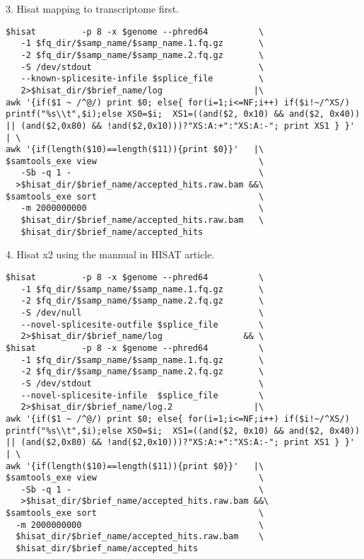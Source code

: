 \begin{frame}[c,fragile]
	\begin{block}{ 3. Hisat mapping to transcriptome first. }
		\begin{lstlisting}[basicstyle=\tiny]
$hisat         -p 8 -x $genome --phred64          \
   -1 $fq_dir/$samp_name/$samp_name.1.fq.gz       \
   -2 $fq_dir/$samp_name/$samp_name.2.fq.gz       \
   -S /dev/stdout                                 \
   --known-splicesite-infile $splice_file         \
   2>$hisat_dir/$brief_name/log                  |\
awk '{if($1 ~ /^@/) print $0; else{ for(i=1;i<=NF;i++) if($i!~/^XS/) printf("%s\\t",$i);else XS0=$i;  XS1=((and($2, 0x10) && and($2, 0x40)) || (and($2,0x80) && !and($2,0x10)))?"XS:A:+":"XS:A:-"; print XS1 } }' | \
awk '{if(length($10)==length($11)){print $0}}'   |\
$samtools_exe view                                \
   -Sb -q 1 -                                     \
  >$hisat_dir/$brief_name/accepted_hits.raw.bam &&\
$samtools_exe sort                                \
   -m 2000000000                                  \
   $hisat_dir/$brief_name/accepted_hits.raw.bam   \
   $hisat_dir/$brief_name/accepted_hits		
		\end{lstlisting}
	\end{block}
\end{frame}

\begin{frame}[c,fragile]
	\begin{block}{ 4. Hisat x2 using the mannual in HISAT article. }
		\begin{lstlisting}[basicstyle=\tiny]
$hisat         -p 8 -x $genome --phred64          \
   -1 $fq_dir/$samp_name/$samp_name.1.fq.gz       \
   -2 $fq_dir/$samp_name/$samp_name.2.fq.gz       \
   -S /dev/null                                   \
   --novel-splicesite-outfile $splice_file        \
   2>$hisat_dir/$brief_name/log                && \
$hisat         -p 8 -x $genome --phred64          \
   -1 $fq_dir/$samp_name/$samp_name.1.fq.gz       \
   -2 $fq_dir/$samp_name/$samp_name.2.fq.gz       \
   -S /dev/stdout                                 \
   --novel-splicesite-infile  $splice_file        \
   2>$hisat_dir/$brief_name/log.2                |\
awk '{if($1 ~ /^@/) print $0; else{ for(i=1;i<=NF;i++) if($i!~/^XS/) printf("%s\\t",$i);else XS0=$i;  XS1=((and($2, 0x10) && and($2, 0x40)) || (and($2,0x80) && !and($2,0x10)))?"XS:A:+":"XS:A:-"; print XS1 } }' | \
awk '{if(length($10)==length($11)){print $0}}'   |\
$samtools_exe view                                \
   -Sb -q 1 -                                     \
   >$hisat_dir/$brief_name/accepted_hits.raw.bam &&\
$samtools_exe sort                                \
  -m 2000000000                                   \
  $hisat_dir/$brief_name/accepted_hits.raw.bam    \
  $hisat_dir/$brief_name/accepted_hits
		\end{lstlisting}
	\end{block}
\end{frame}



